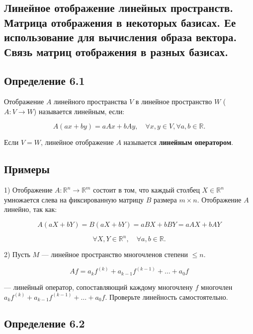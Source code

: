 {
\subsection{Линейное отображение линейных пространств. Матрица отображения в некоторых базисах. Ее использование для вычисления образа вектора.  Связь матриц отображения в разных базисах.}

\subsection*{Определение 6.1}

Отображение \( A \) линейного пространства \( V \) в линейное пространство \( W \) (\( A : V \to W \)) называется линейным, если:



\[
A(ax + by) = aAx + bAy, \quad \forall x, y \in V, \forall a, b \in \mathbb{R}.
\]


Если \( V = W \), линейное отображение \( A \) называется \textbf{линейным оператором}.

\subsection*{Примеры}

1) Отображение \( A : \mathbb{R}^n \to \mathbb{R}^m \) состоит в том, что каждый столбец \( X \in \mathbb{R}^n \) умножается слева на фиксированную матрицу \( B \) размера \( m \times n \). Отображение \( A \) линейно, так как:



\[
A (aX + bY) = B (aX + bY) = a BX + b BY = a A X + b A Y
\]





\[
\forall X, Y \in \mathbb{R}^n, \quad \forall a, b \in \mathbb{R}.
\]



2) Пусть \( M \) — линейное пространство многочленов степени \( \leq n \).



\[
A f = a_k f^{(k)} + a_{k-1} f^{(k-1)} + \dots + a_0 f
\]



— линейный оператор, сопоставляющий каждому многочлену \( f \) многочлен \( a_k f^{(k)} + a_{k-1} f^{(k-1)} + \dots + a_0 f \). Проверьте линейность самостоятельно.

\subsection*{Определение 6.2}

}
